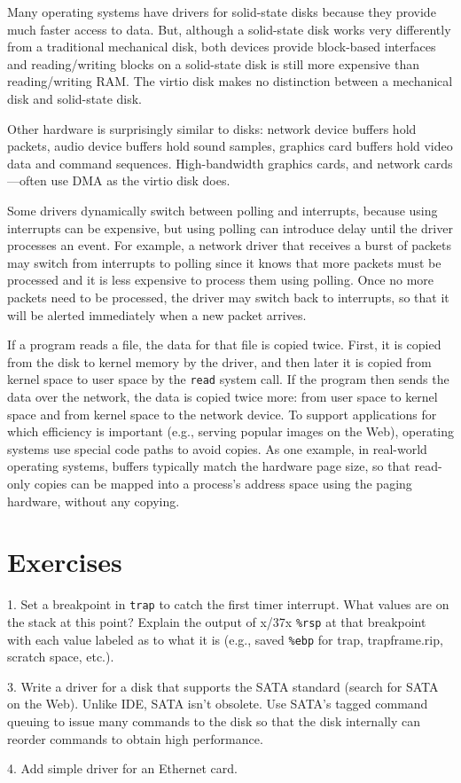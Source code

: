 Many operating systems have drivers for solid-state disks because they
provide much faster access to data.  But, although a solid-state disk
works very differently from a traditional mechanical disk, both
devices provide block-based interfaces and reading/writing blocks on a
solid-state disk is still more expensive than reading/writing RAM.
The virtio disk makes no distinction between a mechanical disk and
solid-state disk.

Other hardware is surprisingly similar to disks: network device
buffers hold packets, audio device buffers hold sound samples,
graphics card buffers hold video data and command sequences.
High-bandwidth graphics cards, and network cards—often use DMA
as the virtio disk does.

Some drivers dynamically switch between polling and interrupts, because using
interrupts can be expensive, but using polling can introduce delay until the
driver processes an event.  For example, a network driver that receives a
burst of packets may switch from interrupts to polling since it knows that more
packets must be processed and it is less expensive to process them using polling.
Once no more packets need to be processed, the driver may switch back to
interrupts, so that it will be alerted immediately when a new packet arrives.

If a program reads a file, the data for that file is copied twice.  First, it
is copied from the disk to kernel memory by the driver, and then later it is
copied from kernel space to user space by the 
\lstinline{read}
system call.  If the program then sends the data over the network, 
the data is copied twice more: from user space to kernel space and from
kernel space to the network device.  To support applications for which 
efficiency is important (e.g., serving popular images on the Web), operating systems
use special code paths to avoid copies.  As one example,
in real-world operating systems, 
buffers typically match the hardware page size, so that
read-only copies can be mapped into a process's address space
using the paging hardware, without any copying.

\section{Exercises}

1. Set a breakpoint in
\lstinline{trap}
to catch the first timer interrupt. What values are on the stack at this
point?  Explain the output of x/37x
\texttt{\%rsp}
at that breakpoint with each value
labeled as to what it is (e.g., saved
\texttt{\%ebp}
for trap, trapframe.rip, scratch space, etc.).

3. Write a driver for a disk that supports the SATA standard (search for SATA on
the Web). Unlike IDE, SATA isn't obsolete.  Use SATA's tagged command queuing to
issue many commands to the disk so that the disk internally can reorder commands
to obtain high performance.

4. Add simple driver for an Ethernet card.
